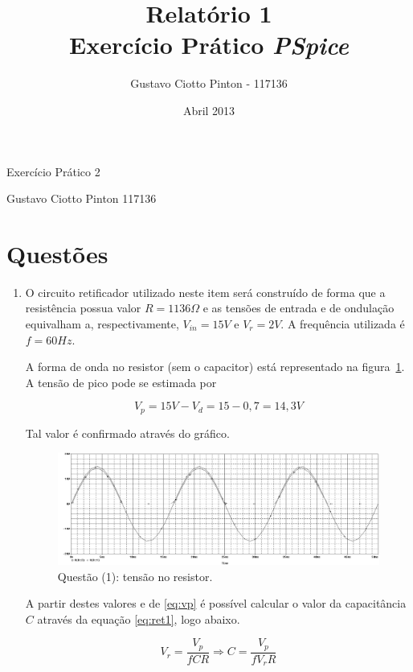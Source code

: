 \documentclass[12pt, a4paper]{article}
\title{Relatório 1\\Exercício Prático \textit{PSpice}}
\author{Gustavo Ciotto Pinton - 117136}
\date{Abril 2013}
\begin{document}
    {\large
    \centerline{Exercício Prático 2}
    \centerline{Gustavo Ciotto Pinton 117136}
    }
    \section*{Questões}
    
    \begin{enumerate}
    
        \item
            O circuito retificador utilizado neste item será construído de forma que a resistência possua valor \(R = 1136\Omega\) e as tensões de entrada e de ondulação equivalham a, respectivamente, \(V_{in} = 15V \) e  \(V_{r} = 2V\). A frequência utilizada é \(f=60Hz\).
            
            A forma de onda no resistor (sem o capacitor) está representado na figura~\ref{circ210}. A tensão de pico pode se estimada por
            
            \begin{equation} \label{eq:vp}
            V_p = 15V - V_d = 15 - 0,7 = 14,3V
            \end{equation}
            
            Tal valor é confirmado através do gráfico.
            
            \begin{figure}[h!] 
                \centering
                \includegraphics[width=1\textwidth]{graf210}
                \caption{Questão (1): tensão no resistor.}        
                \label{circ210}
            \end{figure}
            
            A partir destes valores e de \ref{eq:vp} é possível calcular o valor da capacitância \(C\) através da equação \ref{eq:ret1}, logo abaixo.
            
            \begin{equation} \label{eq:ret1}
            V_r = \frac{V_{p}}{fCR} \Rightarrow C = \frac{V_{p}}{fV_rR}
            \end{equation}
            

\end{enumerate}
\end{document}
